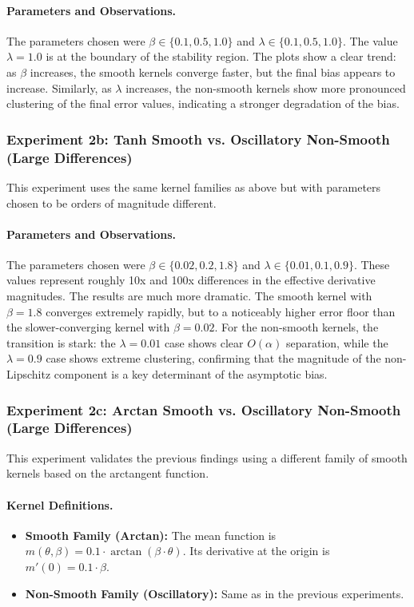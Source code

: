 \documentclass[a4paper]{article}
\begin{document}
\paragraph{Parameters and Observations.}
The parameters chosen were \(\beta \in \{0.1, 0.5, 1.0\}\) and \(\lambda \in \{0.1, 0.5, 1.0\}\). The value \(\lambda=1.0\) is at the boundary of the stability region. The plots show a clear trend: as \(\beta\) increases, the smooth kernels converge faster, but the final bias appears to increase. Similarly, as \(\lambda\) increases, the non-smooth kernels show more pronounced clustering of the final error values, indicating a stronger degradation of the bias.

\subsubsection*{Experiment 2b: Tanh Smooth vs. Oscillatory Non-Smooth (Large Differences)}
This experiment uses the same kernel families as above but with parameters chosen to be orders of magnitude different.

\paragraph{Parameters and Observations.}
The parameters chosen were \(\beta \in \{0.02, 0.2, 1.8\}\) and \(\lambda \in \{0.01, 0.1, 0.9\}\). These values represent roughly 10x and 100x differences in the effective derivative magnitudes. The results are much more dramatic. The smooth kernel with \(\beta=1.8\) converges extremely rapidly, but to a noticeably higher error floor than the slower-converging kernel with \(\beta=0.02\). For the non-smooth kernels, the transition is stark: the \(\lambda=0.01\) case shows clear \(O(\alpha)\) separation, while the \(\lambda=0.9\) case shows extreme clustering, confirming that the magnitude of the non-Lipschitz component is a key determinant of the asymptotic bias.

\subsubsection*{Experiment 2c: Arctan Smooth vs. Oscillatory Non-Smooth (Large Differences)}
This experiment validates the previous findings using a different family of smooth kernels based on the arctangent function.

\paragraph{Kernel Definitions.}
\begin{itemize}
	\item \textbf{Smooth Family (Arctan):} The mean function is \(m(\theta, \beta) = 0.1 \cdot \arctan(\beta \cdot \theta)\). Its derivative at the origin is \(m'(0) = 0.1 \cdot \beta\).
	\item \textbf{Non-Smooth Family (Oscillatory):} Same as in the previous experiments.
\end{itemize}
\end{document}
